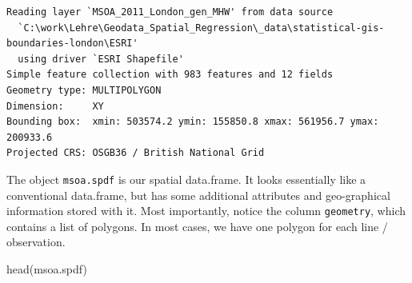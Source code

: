 \documentclass[
  letterpaper,
]{scrbook}
\newenvironment{Shaded}{\begin{snugshade}}{\end{snugshade}}
\newcommand{\FunctionTok}[1]{\textcolor[rgb]{0.28,0.35,0.67}{#1}}
\newcommand{\NormalTok}[1]{\textcolor[rgb]{0.00,0.23,0.31}{#1}}
\begin{document}
\begin{verbatim}
Reading layer `MSOA_2011_London_gen_MHW' from data source 
  `C:\work\Lehre\Geodata_Spatial_Regression\_data\statistical-gis-boundaries-london\ESRI' 
  using driver `ESRI Shapefile'
Simple feature collection with 983 features and 12 fields
Geometry type: MULTIPOLYGON
Dimension:     XY
Bounding box:  xmin: 503574.2 ymin: 155850.8 xmax: 561956.7 ymax: 200933.6
Projected CRS: OSGB36 / British National Grid
\end{verbatim}

The object \texttt{msoa.spdf} is our spatial data.frame. It looks
essentially like a conventional data.frame, but has some additional
attributes and geo-graphical information stored with it. Most
importantly, notice the column \texttt{geometry}, which contains a list
of polygons. In most cases, we have one polygon for each line /
observation.

\begin{Shaded}
\begin{Highlighting}[]
\FunctionTok{head}\NormalTok{(msoa.spdf)}
\end{Highlighting}
\end{Shaded}
\end{document}
